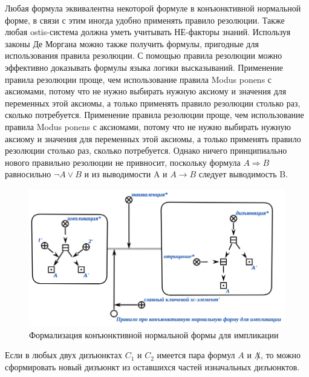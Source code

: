Любая формула эквивалентна некоторой формуле в конъюнктивной нормальной форме, в связи с этим иногда удобно применять правило резолюции. Также любая ostis-система должна уметь учитывать НЕ-факторы знаний. Используя законы Де Моргана можно также получить формулы, пригодные для использования правила резолюции.
С помощью правила резолюции можно эффективно доказывать формулы языка логики высказываний.
Применение правила резолюции проще, чем использование правила Modus ponens с аксиомами, потому что не нужно выбирать нужную аксиому и значения для переменных этой аксиомы, а только применять правило резолюции столько раз, сколько потребуется.
Применение правила резолюции проще, чем использование правила Modus ponens с аксиомами, потому что не нужно выбирать нужную аксиому и значения для переменных этой аксиомы, а только применять правило резолюции столько раз, сколько потребуется.
Однако ничего принципиально нового правильно резолюции не привносит, поскольку формула $A \Rightarrow B$  равносильно $\neg A \lor B$ и из выводимости A и $A \rightarrow B$ следует выводимость B.

\begin{figure}[H]
	\includegraphics[scale=0.8]{author/part3/figures/conjunction_implication_rule.png}
	\caption{Формализация конъюнктивной нормальной формы для импликации}
	\label{fig:conjunction_implication_rule}
\end{figure}

Если в любых двух дизъюнктах $C_1$ и $C_2$ имеется пара формул $A$ и $\not A$, то можно сформировать новый дизъюнкт из оставшихся частей изначальных дизъюнктов.

